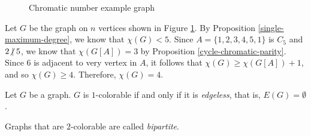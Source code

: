 \begin{figure}[ht!]
    \centering
\caption{Chromatic number example graph}
\label{fig:chromatic-graph-example}
\end{figure}

\begin{exmp}
    Let $G$ be the graph on $n$ vertices shown in Figure \ref{fig:chromatic-graph-example}. By Proposition \ref{single-maximum-degree}, we know that $\chi(G) < 5$. Since $A = \{1, 2, 3, 4, 5, 1\}$ is $C_5$ and $2 \centernot\mid 5$, we know that $\chi(G[A]) = 3$ by Proposition \ref{cycle-chromatic-parity}. Since $6$ is adjacent to very vertex in $A$, it follows that $\chi(G) \geq \chi(G[A]) + 1$, and so $\chi(G) \geq 4$. Therefore, $\chi(G) = 4$.
\end{exmp}

\begin{prop}
    Let $G$ be a graph. $G$ is $1$-colorable if and only if it is \emph{edgeless}, that is, $E(G) = \emptyset$.
\end{prop}

\begin{defn}
    Graphs that are $2$-colorable are called \emph{bipartite}.
\end{defn}

